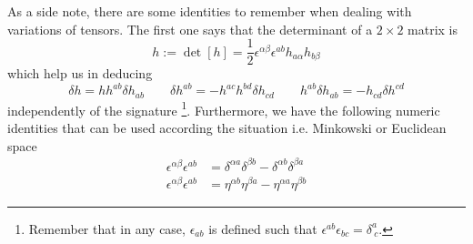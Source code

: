 \documentclass[a4paper,12pt]{article}
\numberwithin{equation}{section}
\numberwithin{thm}{section}
\numberwithin{exm}{section}
\newcommand{\<}{{\langle}}
\renewcommand{\>}{{\rangle}}
\renewcommand{\a}{{\alpha}}
\renewcommand{\b}{{\beta}}
\renewcommand{\d}{{\delta}}
\newcommand{\e}{{\epsilon}}
\begin{document}
As a side note, there are some identities to remember when dealing with variations of tensors. The first one says that the determinant of a $2\times 2$ matrix is
	\begin{equation}
	h := \det[h] = \frac{1}{2} \e^{\a\b}\e^{ab} h_{a\a} h_{b\b}
	\end{equation}
which help us in deducing
	\begin{equation}
	\d h = h h^{ab}\d h_{ab} \qquad \d h^{ab} = -h^{ac} h^{bd} \d h_{cd} \qquad h^{ab}\d h_{ab} = - h_{cd} \d h^{cd}
	\end{equation}
independently of the signature%
\footnote{Remember that in any case, $\e_{ab}$ is defined such that $ \e^{ab}\e_{bc} = \d^a_{\ c} $.}. Furthermore, we have the following numeric identities that can be used according the situation i.e. Minkowski or Euclidean space
	\begin{align}
	\e^{\a\b}\e^{ab} & = \d^{\a a} \d^{\b b} - \d^{\a b} \d^{\b a} \\
	\e^{\a\b}\e^{ab} & = \eta^{\a b}\eta^{\b a} - \eta^{\a a}\eta^{\b b}
	\end{align}

\newpage




\end{document}
